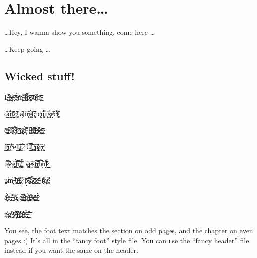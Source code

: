 
\Clear
\chapter{Almost there\dots}
\label{cha:almost_there}

\vspace*{160pt}

\centering

\dots Hey, I wanna show you something, come here \dots

\newpage

\vspace*{200pt}

\dots Keep going \dots

\newpage

\section{Wicked stuff!}
\label{sec:wicked_stuff}

L̶͇̉͋̊̚o̶̜̭͉͉̠̾̇r̴̨͎͕̀͝ë̵̼́m̵̧͔͍̦̂̑̀̔̚ ̸̻̬̝͌i̸̥̻͙̫̾͆̒͠p̵̡̞̗̦̫̋͝ṣ̸̈̆̂͑u̴͖̇͋̚m̵̺͇͝͠

d̷̘͇̎̓̓ő̴̺̀ľ̷͉̺̼̱͛̽ó̸̦͚̔̾̾ a̸̡͠m̴̖͈̥̒͂͝ȩ̸̯͎̈́́̎ț̶̋̓,̴͍͈͎͉̲̋͛̌͒̂ c̶̜̭͑ͅó̶̬͚̟͌͌̒̀n̶͕̫͎̊͐ṡ̴̡̡͓̜̀ḛ̴̏̅͑̕c̴͉̀͌̔̓͛t̸͈͉̥͚͛͒

ẽ̸̢͎̣̺̐t̵̝̱̮̠̚ŭ̸̡̜̥͉͊͐̿e̵̟̦͕̍̉̔̚ř̷̛͈̭͈̈́̓͝ ̴̢̮̰̠̋̊͗a̸̭͉̬̽̔d̴̛̦͛̿̍̀ ị̶̲̈́̕̚p̸̡̤͈̀́͛̚͝i̶̹̜͇̒͗̔̕ş̶͕̜̓̀̊͆͝c̵̥̘͖̠̄̎̎į̴̨̮͔͓̋̒͊̒

n̴̳̰̘̹̻͊̎̈̃͝g̶̼͑͋̏ ̴̩̩͛̾e̵̦͗͘ļ̵̱̳͑ỉ̷̲̝̙̦̪͠t̶̤͙̝̅.̷̱̤̋̈́̊͛ U̸̘̺̖͆̑̃̚͜͝ţ̶̠͚̋̅̇̓̓ ̴̨͕͑̏p̷̢̛̟̖̯̝̈́͐̽͝u̴̼͍̩͒͘ͅr̴̨̛͉̮

u̸̢͔̿̒̌ś̷͉͐͑̎̂ ̵̣̟̅e̶̤̯̦̰̪̋l̴̮͊̀͋̒͝i̵̧̐̊t̸̪̘̝̅,̵̦̻̽̊̉͐́ v̷͎̪̭͖̓͐͝ḙ̴̘̇̆s̵͔̈́ţ̴̜̯͉̤̿̎į̴̨̲͙̒͋̏͝b̷͉̈́̚u̵̬͛̇͝l̷̖̣͂͗̓̈́͜͜

u̷̱̚m̴͉͆ ̵̦͌u̶̱͓͉͚̇̒̈́̑ͅt̴̢͍̗͎̄͌,̷̛͓͆ p̴̹̰̏͑̈̚͝l̸̨͔̫̼̔̿̔ä̷̟̖͈́͑̀͐͊c̷̩͇͙̩̈̅ȇ̶̛̥̯̪̝̈̋ r̷͔̖̹̫̽̂̓̀a̴̩͔̦̙͆ͅt̴̡̮͊̆̕

à̶̰̦̘̹̈́̔̕c̶̩̻͎̉,̵̨̪̤̻͌ͅ ̵̫̱̜̓͐ã̵̧̢̩̓ ḑ̶͍̗̺̅͜i̵̭̺̪̯͈̐͋̍p̷͉̮͚̹̒̉í̶̡̥̥̫̂̔̚s̶̡̋c̶͍͍̰̠̈̃ḭ̷͚̠͕̈́̋

ṅ̵̪͐g̸̥̊̍ ̵̢̬̯͛͂v̶̖̦̀͆̐̏i̴̺̼͍̥̊̓t̸̡̎̐̈ą̶͓̘͍̠̄̾̓̕ë̵̙̱̩́͂̒̃͘͜͜,̵̲͈̲̲͖̔͂̏̚͝


\vspace{350pt}
You see, the foot text matches the section on odd pages, and the chapter on even pages :) It's all in the ``fancy foot'' style file. You can use the ``fancy header'' file instead if you want the same on the header.

